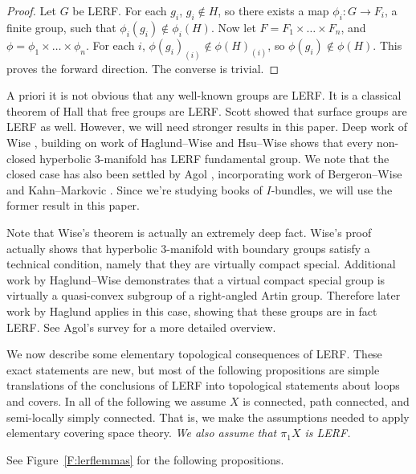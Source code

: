 \begin{proof}

Let $G$ be LERF. For each $g_i$, $g_i \notin H$, so there exists a map $\phi_i
\colon G \to F_i$, a finite group, such that $\phi_i(g_i) \notin \phi_i(H)$.
Now let $F = F_1 \times \dots \times F_n$, and $\phi = \phi_1 \times \dots
\times \phi_n$.  For each $i$, $\phi(g_i)_{(i)} \notin \phi(H)_{(i)}$, so
$\phi(g_i) \notin \phi(H)$.  This proves the forward direction.  The converse
is trivial.

\end{proof}

A priori it is not obvious that any well-known groups are LERF. It is
a classical theorem of Hall \cite{Hall} that free groups are LERF. Scott
\cite{Scott} showed that surface groups are LERF as well. However, we will need
stronger results in this paper. Deep work of Wise \cite{Wise}, building on work
of Haglund--Wise \cite{HaglundWise} and Hsu--Wise \cite{HsuWise} shows that
every non-closed hyperbolic $3$-manifold has LERF fundamental group.  We note
that the closed case has also been settled by Agol \cite{Agol}, incorporating
work of Bergeron--Wise \cite{BergeronWise} and Kahn--Markovic \cite{KM}. Since
we're studying books of $I$-bundles, we will use the former result in this
paper.

Note that Wise's theorem is actually an extremely deep fact. Wise's proof
actually shows that hyperbolic $3$-manifold with boundary groups satisfy
a technical condition, namely that they are virtually compact special.
Additional work by Haglund--Wise \cite{HaglundWise1} demonstrates that
a virtual compact special group is virtually a quasi-convex subgroup of
a right-angled Artin group. Therefore later work by Haglund \cite{Haglund}
applies in this case, showing that these groups are in fact LERF. See Agol's
survey \cite{Agolsurvey} for a more detailed overview.

We now describe some elementary topological consequences of LERF. These exact
statements are new, but most of the following propositions are simple
translations of the conclusions of LERF into topological statements about loops
and covers. In all of the following we assume $X$ is connected, path connected,
and semi-locally simply connected. That is, we make the assumptions needed to
apply elementary covering space theory. \emph{We also assume that $\pi_1X$ is
LERF.}

See Figure~\ref{F:lerflemmas} for the following propositions.


